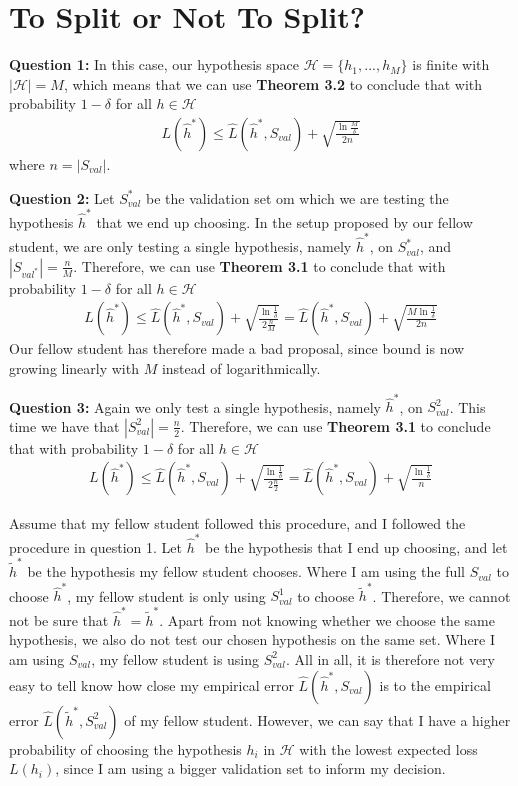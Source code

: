 \documentclass[12pt]{article}
\begin{document}
\section{To Split or Not To Split?}



\textbf{Question 1:} In this case, our hypothesis space $\mathcal{H} = \{h_1,...,h_M \}$ is finite with $|\mathcal{H}| = M$, which means that we can use \textbf{Theorem 3.2} to conclude that with probability $1 - \delta$ for all $h \in \mathcal{H}$
\begin{align}
L(\hat{h}^*) \leq \hat{L}(\hat{h}^*, S_{val}) + \sqrt{\frac{\ln \frac{M}{\delta}}{2n}}
\end{align}
where $n=|S_{val}|$.

\textbf{Question 2:} Let $S_{val}^*$ be the validation set om which we are testing the hypothesis $\hat{h}^*$ that we end up choosing. In the setup proposed by our fellow student, we are only testing a single hypothesis, namely $\hat{h}^*$, on $S_{val}^*$, and $|S_{val^*}|=\frac{n}{M}$. Therefore, we can use \textbf{Theorem 3.1} to conclude that with probability $1 - \delta$ for all $h \in \mathcal{H}$
\begin{align}
L(\hat{h}^*) \leq \hat{L}(\hat{h}^*, S_{val}) + \sqrt{\frac{\ln \frac{1}{\delta}}{2\frac{n}{M}}} = \hat{L}(\hat{h}^*, S_{val}) + \sqrt{\frac{ M \ln \frac{1}{\delta}}{2n}}
\end{align}
Our fellow student has therefore made a bad proposal, since bound is now growing linearly with $M$ instead of logarithmically.

\textbf{Question 3:} Again we only test a single hypothesis, namely $\hat{h}^*$, on $S_{val}^2$. This time we have that $|S_{val}^2|=\frac{n}{2}$. Therefore, we can use \textbf{Theorem 3.1} to conclude that with probability $1 - \delta$ for all $h \in \mathcal{H}$
\begin{align}
L(\hat{h}^*) \leq \hat{L}(\hat{h}^*, S_{val}) + \sqrt{\frac{\ln \frac{1}{\delta}}{2\frac{n}{2}}} = \hat{L}(\hat{h}^*, S_{val}) + \sqrt{\frac{ \ln \frac{1}{\delta}}{n}}
\end{align}

Assume that my fellow student followed this procedure, and I followed the procedure in question 1. Let $\hat{h}^*$ be the hypothesis that I end up choosing, and let $\tilde{h}^*$ be the hypothesis my fellow student chooses. Where I am using the full $S_{val}$ to choose $\hat{h}^*$, my fellow student is only using $S^1_{val}$ to choose $\tilde{h}^*$. Therefore, we cannot not be sure that $\hat{h}^* = \tilde{h}^*$. Apart from not knowing whether we choose the same hypothesis, we also do not test our chosen hypothesis on the same set. Where I am using $S_{val}$, my fellow student is using $S_{val}^2$. All in all, it is therefore not very easy to tell know how close my empirical error $\hat{L}(\hat{h}^*,S_{val})$ is to the empirical error $\hat{L}(\tilde{h}^*,S_{val}^2)$ of my fellow student. However, we can say that I have a higher probability of choosing the hypothesis $h_i$ in $\mathcal{H}$ with the lowest expected loss $L(h_i)$, since I am using a bigger validation set to inform my decision.
\end{document}
